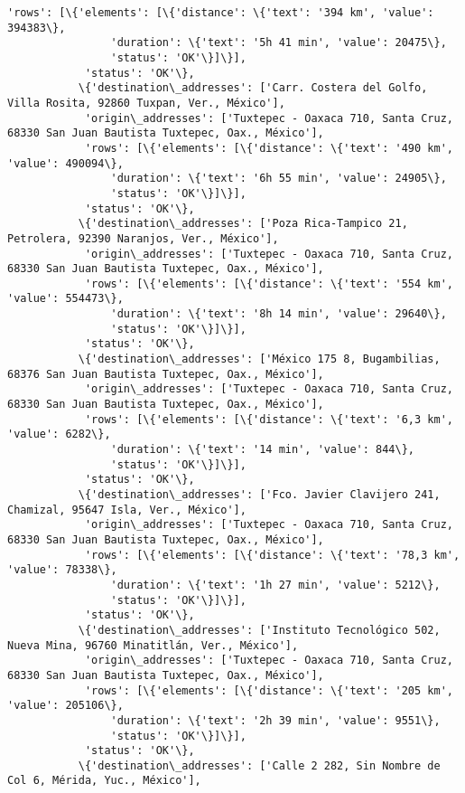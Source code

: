 \documentclass[11pt]{article}
\begin{document}
\begin{Verbatim}[commandchars=\\\{\}]
            'rows': [\{'elements': [\{'distance': \{'text': '394 km', 'value': 394383\},
                'duration': \{'text': '5h 41 min', 'value': 20475\},
                'status': 'OK'\}]\}],
            'status': 'OK'\},
           \{'destination\_addresses': ['Carr. Costera del Golfo, Villa Rosita, 92860 Tuxpan, Ver., México'],
            'origin\_addresses': ['Tuxtepec - Oaxaca 710, Santa Cruz, 68330 San Juan Bautista Tuxtepec, Oax., México'],
            'rows': [\{'elements': [\{'distance': \{'text': '490 km', 'value': 490094\},
                'duration': \{'text': '6h 55 min', 'value': 24905\},
                'status': 'OK'\}]\}],
            'status': 'OK'\},
           \{'destination\_addresses': ['Poza Rica-Tampico 21, Petrolera, 92390 Naranjos, Ver., México'],
            'origin\_addresses': ['Tuxtepec - Oaxaca 710, Santa Cruz, 68330 San Juan Bautista Tuxtepec, Oax., México'],
            'rows': [\{'elements': [\{'distance': \{'text': '554 km', 'value': 554473\},
                'duration': \{'text': '8h 14 min', 'value': 29640\},
                'status': 'OK'\}]\}],
            'status': 'OK'\},
           \{'destination\_addresses': ['México 175 8, Bugambilias, 68376 San Juan Bautista Tuxtepec, Oax., México'],
            'origin\_addresses': ['Tuxtepec - Oaxaca 710, Santa Cruz, 68330 San Juan Bautista Tuxtepec, Oax., México'],
            'rows': [\{'elements': [\{'distance': \{'text': '6,3 km', 'value': 6282\},
                'duration': \{'text': '14 min', 'value': 844\},
                'status': 'OK'\}]\}],
            'status': 'OK'\},
           \{'destination\_addresses': ['Fco. Javier Clavijero 241, Chamizal, 95647 Isla, Ver., México'],
            'origin\_addresses': ['Tuxtepec - Oaxaca 710, Santa Cruz, 68330 San Juan Bautista Tuxtepec, Oax., México'],
            'rows': [\{'elements': [\{'distance': \{'text': '78,3 km', 'value': 78338\},
                'duration': \{'text': '1h 27 min', 'value': 5212\},
                'status': 'OK'\}]\}],
            'status': 'OK'\},
           \{'destination\_addresses': ['Instituto Tecnológico 502, Nueva Mina, 96760 Minatitlán, Ver., México'],
            'origin\_addresses': ['Tuxtepec - Oaxaca 710, Santa Cruz, 68330 San Juan Bautista Tuxtepec, Oax., México'],
            'rows': [\{'elements': [\{'distance': \{'text': '205 km', 'value': 205106\},
                'duration': \{'text': '2h 39 min', 'value': 9551\},
                'status': 'OK'\}]\}],
            'status': 'OK'\},
           \{'destination\_addresses': ['Calle 2 282, Sin Nombre de Col 6, Mérida, Yuc., México'],

\end{Verbatim}
\end{document}
